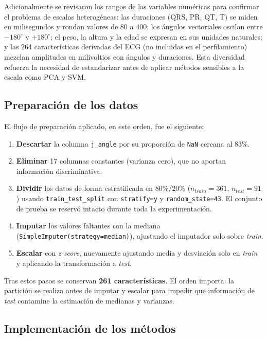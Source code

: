 Adicionalmente se revisaron los rangos de las variables numéricas para
confirmar el problema de escalas heterogéneas: las duraciones (QRS, PR, QT,
T) se miden en milisegundos y rondan valores de 80 a 400; los ángulos
vectoriales oscilan entre $-180^{\circ}$ y $+180^{\circ}$; el peso, la
altura y la edad se expresan en sus unidades naturales; y las 264
características derivadas del ECG (no incluidas en el perfilamiento)
mezclan amplitudes en milivoltios con ángulos y duraciones. Esta
diversidad refuerza la necesidad de estandarizar antes de aplicar métodos
sensibles a la escala como PCA y SVM.

\subsection{Preparación de los datos}

El flujo de preparación aplicado, en este orden, fue el siguiente:

\begin{enumerate}
    \item \textbf{Descartar} la columna \texttt{j\_angle} por su proporción
          de \texttt{NaN} cercana al 83\%.
    \item \textbf{Eliminar} 17 columnas constantes (varianza cero), que no
          aportan información discriminativa.
    \item \textbf{Dividir} los datos de forma estratificada en $80\%/20\%$
          ($n_{train}=361$, $n_{test}=91$) usando \texttt{train\_test\_split}
          con \texttt{stratify=y} y \texttt{random\_state=43}. El conjunto de
          prueba se reservó intacto durante toda la experimentación.
    \item \textbf{Imputar} los valores faltantes con la mediana
          (\texttt{SimpleImputer(strategy=\textquotesingle median\textquotesingle)}),
          ajustando el imputador solo sobre \textit{train}.
    \item \textbf{Escalar} con \textit{z-score}, nuevamente ajustando
          media y desviación solo en \textit{train} y aplicando la
          transformación a \textit{test}.
\end{enumerate}

Tras estos pasos se conservan \textbf{261 características}. El orden
importa: la partición se realiza antes de imputar y escalar para impedir
que información de \textit{test} contamine la estimación de medianas y
varianzas.

\subsection{Implementación de los métodos}

